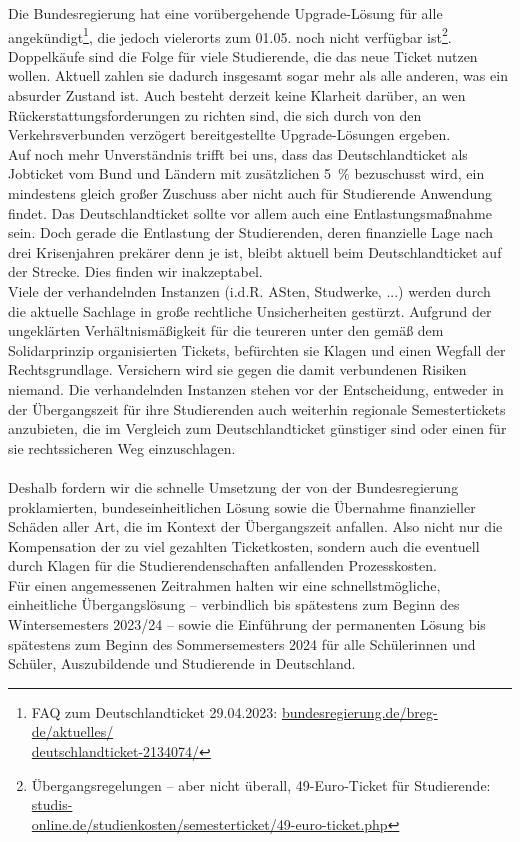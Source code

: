 \documentclass[DIV=calc]{scrartcl}
\begin{document}
%
Die Bundesregierung hat eine vorübergehende Upgrade-Lösung für alle angekündigt\footnote{\label{FAQ}FAQ zum Deutschlandticket 29.04.2023: \href{https://www.bundesregierung.de/breg-de/aktuelles/deutschlandticket-2134074}{bundesregierung.de/breg-de/aktuelles/\\deutschlandticket-2134074/}}, die jedoch vielerorts zum 01.05. noch nicht verfügbar ist\footnote{Übergangsregelungen – aber nicht überall, 49-Euro-Ticket für Studierende: \href{https://www.studis-online.de/studienkosten/semesterticket/49-euro-ticket.php}{studis-\\online.de/studienkosten/semesterticket/49-euro-ticket.php}}. Doppelkäufe sind die Folge für viele Studierende, die das neue Ticket nutzen wollen. Aktuell zahlen sie dadurch insgesamt sogar mehr als alle anderen, was ein absurder Zustand ist. Auch besteht derzeit keine Klarheit darüber, an wen Rückerstattungsforderungen zu richten sind, die sich durch von den Verkehrsverbunden verzögert bereitgestellte Upgrade-Lösungen ergeben.\\
%
Auf noch mehr Unverständnis trifft bei uns, dass das Deutschlandticket als Jobticket vom Bund und Ländern mit zusätzlichen \SI{5}{\percent} bezuschusst wird, ein mindestens gleich großer Zuschuss aber nicht auch für Studierende Anwendung findet. Das Deutschlandticket sollte vor allem auch eine Entlastungsmaßnahme sein. Doch gerade die Entlastung der Studierenden, deren finanzielle Lage nach drei Krisenjahren prekärer denn je ist, bleibt aktuell beim Deutschlandticket auf der Strecke. Dies finden wir inakzeptabel.\\
%
Viele der verhandelnden Instanzen (i.d.R. ASten, Studwerke, ...) werden durch die aktuelle Sachlage in große rechtliche Unsicherheiten gestürzt. Aufgrund der ungeklärten Verhältnismäßigkeit für die teureren unter den gemäß dem Solidarprinzip organisierten Tickets, befürchten sie Klagen und einen Wegfall der Rechtsgrundlage. Versichern wird sie gegen die damit verbundenen Risiken niemand. Die verhandelnden Instanzen stehen vor der Entscheidung, entweder in der Übergangszeit für ihre Studierenden auch weiterhin regionale Semestertickets anzubieten, die im Vergleich zum Deutschlandticket günstiger sind oder einen für sie rechtssicheren Weg einzuschlagen.\\\\
%
Deshalb fordern wir die schnelle Umsetzung der von der Bundesregierung proklamierten, bundeseinheitlichen Lösung sowie die Übernahme finanzieller Schäden aller Art, die im Kontext der Übergangszeit anfallen. Also nicht nur die Kompensation der zu viel gezahlten Ticketkosten, sondern auch die eventuell durch Klagen für die Studierendenschaften anfallenden Prozesskosten.\\
Für einen angemessenen Zeitrahmen halten wir eine schnellstmögliche, einheitliche Übergangslösung -- verbindlich bis spätestens zum Beginn des Wintersemesters 2023/24 -- sowie die Einführung der permanenten Lösung bis spätestens zum Beginn des Sommersemesters 2024 für alle Schülerinnen und Schüler, Auszubildende und Studierende in Deutschland.
\end{document}
